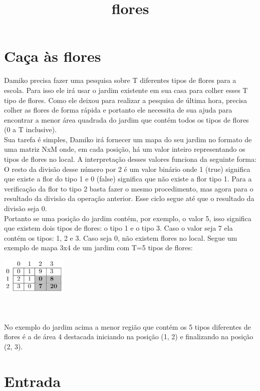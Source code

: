 \documentclass{article}
\title{flores}
\begin{document}
\section{Caça às flores}

Damiko precisa fazer uma pesquisa sobre T diferentes tipos de flores para a escola. Para isso ele irá usar o jardim existente em sua casa para colher esses T tipo de flores. Como ele deixou para realizar a pesquisa de última hora, precisa colher as flores de forma rápida e portanto ele necessita de sua ajuda para encontrar a menor área quadrada do jardim que contém todos os tipos de flores (0 a T inclusive).
\\
Sua tarefa é simples, Damiko irá fornecer um mapa do seu jardim no formato de uma matriz NxM onde, em cada posição, há um valor inteiro representando os tipos de flores no local. A interpretação desses valores funciona da seguinte forma: O resto da divisão desse número por 2 é um valor binário onde 1 (true) significa que existe a flor do tipo 1 e 0 (false) significa que não existe a flor tipo 1. Para a verificação da flor to tipo 2 basta fazer o mesmo procedimento, mas agora para o resultado da divisão da operação anterior. Esse ciclo segue até que o resultado da divisão seja 0.
\\
Portanto se uma posição do jardim contém, por exemplo, o valor 5, isso significa que existem dois tipos de flores: o tipo 1 e o tipo 3. Caso o valor seja 7 ela contém os tipos:  1, 2 e 3. Caso seja 0, não existem flores no local.
Segue um exemplo de mapa 3x4 de um jardim com T=5 tipos de flores:
\\
\begin{center}
\includegraphics[width=120]{floresTabela.PNG}
\end{center}
\\ \\
No exemplo do jardim acima a menor região que contém os 5 tipos diferentes de flores é a de área 4 destacada iniciando na posição (1, 2) e finalizando na posição (2, 3).

\section*{Entrada}
\end{document}
